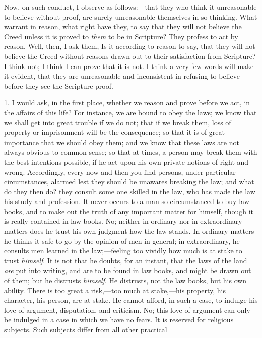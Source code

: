 Now, on such conduct, I observe as follows:—that they who think
it unreasonable to believe without proof, are surely unreasonable
themselves in so thinking. What warrant in reason, what right have
they, to say that they will not believe the Creed unless it is proved
to \emph{them} to be in Scripture? They profess to act by reason.
Well, then, I ask them, Is it according to reason to say, that they
will not believe the Creed without reasons drawn out to their
satisfaction from Scripture? I think not; I think I can prove that it
is not. I think a very few words will make it evident, that they are
unreasonable and inconsistent in refusing to believe before they see
the Scripture proof.

1. I would ask, in the first place, whether we reason and prove
before we act, in the affairs of this life? For instance, we are bound
to obey the laws; we know that we shall get into great trouble if we
do not; that if we break them, loss of property or imprisonment will
be the consequence; so that it is of great importance that we should
obey them; and we know that these laws are not always obvious to
common sense; so that at times, a person may break them with the best
intentions possible, if he act upon his own private notions of right
and wrong. Accordingly, every now and then you find persons, under
particular circumstances, alarmed lest they should be unawares
breaking the law; and what do they then do? they consult some one
skilled in the law, who has made the law his study and profession. It
never occurs to a man so circumstanced to buy law books, and to make
out the truth of any important matter for himself, though it is really
contained in law books. No; neither in ordinary nor in extraordinary
matters does he trust his own judgment how the law stands. In ordinary
matters he thinks it safe to go by the opinion of men in general; in
extraordinary, he consults men learned in the law;—feeling too
vividly how much is at stake to trust \emph{himself}. It is not that he
doubts, for an instant, that the laws of the land \emph{are} put into
writing, and are to be found in law books, and might be drawn out of
them; but he distrusts \emph{himself}. He distrusts, not the law
books, but his own ability. There is too great a risk,—too much at
stake,—his property, his character, his person, are at stake. He
cannot afford, in such a case, to indulge his love of argument,
disputation, and criticism. No; this love of argument can only be
indulged in a case in which we have no fears. It is reserved for
religious subjects. Such subjects differ from all other practical
